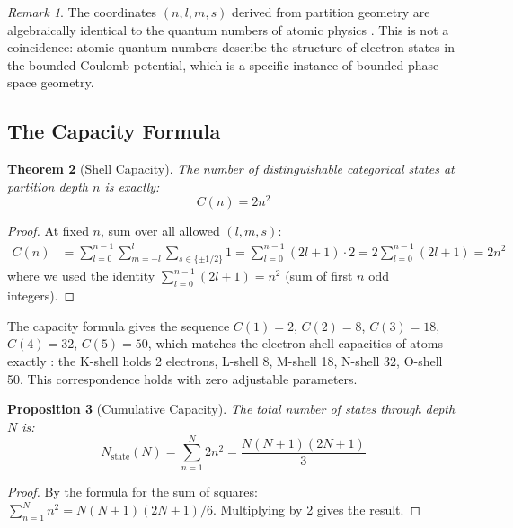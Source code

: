 \documentclass[11pt,a4paper]{article}
\newtheorem{theorem}{Theorem}[section]
\newtheorem{proposition}[theorem]{Proposition}
\theoremstyle{definition}
\theoremstyle{remark}
\newtheorem{remark}[theorem]{Remark}
\begin{document}
\begin{remark}
The coordinates $(n, l, m, s)$ derived from partition geometry are algebraically identical to the quantum numbers of atomic physics \citep{griffiths2018}. This is not a coincidence: atomic quantum numbers describe the structure of electron states in the bounded Coulomb potential, which is a specific instance of bounded phase space geometry.
\end{remark}

\subsection{The Capacity Formula}

\begin{theorem}[Shell Capacity]
\label{thm:capacity}
The number of distinguishable categorical states at partition depth $n$ is exactly:
\begin{equation}
C(n) = 2n^2
\label{eq:capacity}
\end{equation}
\end{theorem}

\begin{proof}
At fixed $n$, sum over all allowed $(l, m, s)$:
\begin{align}
C(n) &= \sum_{l=0}^{n-1} \sum_{m=-l}^{l} \sum_{s \in \{\pm 1/2\}} 1 = \sum_{l=0}^{n-1} (2l+1) \cdot 2 = 2 \sum_{l=0}^{n-1} (2l+1) = 2n^2
\end{align}
where we used the identity $\sum_{l=0}^{n-1} (2l+1) = n^2$ (sum of first $n$ odd integers).
\end{proof}

The capacity formula gives the sequence $C(1) = 2$, $C(2) = 8$, $C(3) = 18$, $C(4) = 32$, $C(5) = 50$, which matches the electron shell capacities of atoms exactly \citep{bohr1913, pauli1925}: the K-shell holds 2 electrons, L-shell 8, M-shell 18, N-shell 32, O-shell 50. This correspondence holds with zero adjustable parameters.

\begin{proposition}[Cumulative Capacity]
\label{prop:cumulative}
The total number of states through depth $N$ is:
\begin{equation}
N_{\mathrm{state}}(N) = \sum_{n=1}^{N} 2n^2 = \frac{N(N+1)(2N+1)}{3}
\label{eq:cumulative}
\end{equation}
\end{proposition}

\begin{proof}
By the formula for the sum of squares: $\sum_{n=1}^{N} n^2 = N(N+1)(2N+1)/6$. Multiplying by 2 gives the result.
\end{proof}
\end{document}
